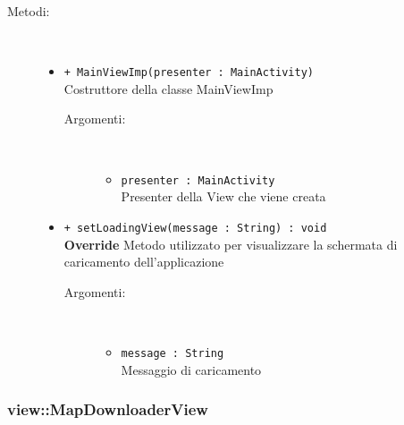 \documentclass[../DefinizioneDiProdotto.tex]{subfiles}
\begin{document}
\begin{description}
\begin{itemize}
\end{itemize}
\item[Metodi:] \
\begin{itemize}
\item \texttt{+ MainViewImp(presenter : MainActivity)}\\
Costruttore della classe MainViewImp
 \begin{description}
\item[Argomenti:] \
\begin{itemize}
\item \texttt{presenter : MainActivity}\\
Presenter della View che viene creata\end{itemize}
\end{description}
\item \texttt{+ setLoadingView(message : String) : void}\\
\textbf{Override} Metodo utilizzato per visualizzare la schermata di caricamento dell'applicazione
 \begin{description}
\item[Argomenti:] \
\begin{itemize}
\item \texttt{message : String}\\
Messaggio di caricamento\end{itemize}
\end{description}
\end{itemize}
\end{description}

\subsubsection{view::MapDownloaderView}
\end{document}
